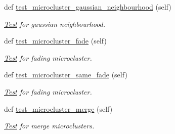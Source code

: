 \begin{DoxyCompactItemize}
def \hyperlink{classStreamClusteringAlgorithms_1_1evoStream_1_1v1_1_1Tests_1_1MicroClusterV1Test_1_1Test_a0d79eac574b5292c7901cbf4ed640ca3}{test\+\_\+microcluster\+\_\+gaussian\+\_\+neighbourhood} (self)
\begin{DoxyCompactList}\small\item\em \hyperlink{classStreamClusteringAlgorithms_1_1evoStream_1_1v1_1_1Tests_1_1MicroClusterV1Test_1_1Test}{Test} for gaussian neighbourhood. \end{DoxyCompactList}\item 
def \hyperlink{classStreamClusteringAlgorithms_1_1evoStream_1_1v1_1_1Tests_1_1MicroClusterV1Test_1_1Test_ad4b4beb7a4f40cdfffa8c2f88c4778f5}{test\+\_\+microcluster\+\_\+fade} (self)
\begin{DoxyCompactList}\small\item\em \hyperlink{classStreamClusteringAlgorithms_1_1evoStream_1_1v1_1_1Tests_1_1MicroClusterV1Test_1_1Test}{Test} for fading microcluster. \end{DoxyCompactList}\item 
def \hyperlink{classStreamClusteringAlgorithms_1_1evoStream_1_1v1_1_1Tests_1_1MicroClusterV1Test_1_1Test_ad83330697fbcbd11b5aa21f8433fd769}{test\+\_\+microcluster\+\_\+same\+\_\+fade} (self)
\begin{DoxyCompactList}\small\item\em \hyperlink{classStreamClusteringAlgorithms_1_1evoStream_1_1v1_1_1Tests_1_1MicroClusterV1Test_1_1Test}{Test} for fading microcluster. \end{DoxyCompactList}\item 
def \hyperlink{classStreamClusteringAlgorithms_1_1evoStream_1_1v1_1_1Tests_1_1MicroClusterV1Test_1_1Test_aebd05484219193bbe05176e04964b7e8}{test\+\_\+microcluster\+\_\+merge} (self)
\begin{DoxyCompactList}\small\item\em \hyperlink{classStreamClusteringAlgorithms_1_1evoStream_1_1v1_1_1Tests_1_1MicroClusterV1Test_1_1Test}{Test} for merge microclusters. \end{DoxyCompactList}\end{DoxyCompactItemize}
